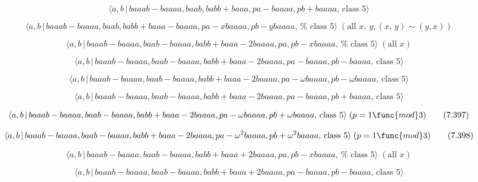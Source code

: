 \documentclass[10pt]{article}
\begin{document}
\begin{equation}
\langle a,b\,|\,baaab-baaaa,baab,babb+baaa,pa-baaaa,pb+baaaa,\,\text{class }%
5\rangle  \tag{7.391}
\end{equation}

\begin{equation}
\langle a,b\,|\,baaab-baaaa,baab,babb+baaa-baaaa,pa-xbaaaa,pb-ybaaaa,\,\text{%
class }5\rangle \;(\text{all }x,\,y,(x,\,y)\sim (y,x))  \tag{7.392}
\end{equation}

\begin{equation}
\langle a,b\,|\,baaab-baaaa,baab-baaaa,babb+baaa-2baaaa,pa,pb-xbaaaa,\,\text{%
class }5\rangle \;(\text{all }x)  \tag{7.393}
\end{equation}

\begin{equation}
\langle a,b\,|\,baaab-baaaa,baab-baaaa,babb+baaa-2baaaa,pa-baaaa,pb-baaaa,\,%
\text{class }5\rangle  \tag{7.394}
\end{equation}

\begin{equation}
\langle a,b\,|\,baaab-baaaa,baab-baaaa,babb+baaa-2baaaa,pa-\omega
baaaa,pb-\omega baaaa,\,\text{class }5\rangle  \tag{7.395}
\end{equation}

\begin{equation}
\langle a,b\,|\,baaab-baaaa,baab-baaaa,babb+baaa-2baaaa,pa-baaaa,pb+baaaa,\,%
\text{class }5\rangle  \tag{7.396}
\end{equation}

\begin{equation}
\langle a,b\,|\,baaab-baaaa,baab-baaaa,babb+baaa-2baaaa,pa-\omega
baaaa,pb+\omega baaaa,\,\text{class }5\rangle \;(p=1\func{mod}3)  \tag{7.397}
\end{equation}

\begin{equation}
\langle a,b\,|\,baaab-baaaa,baab-baaaa,babb+baaa-2baaaa,pa-\omega
^{2}baaaa,pb+\omega ^{2}baaaa,\,\text{class }5\rangle \;(p=1\func{mod}3) 
\tag{7.398}
\end{equation}

\begin{equation}
\langle a,b\,|\,baaab-baaaa,baab-baaaa,babb+baaa+2baaaa,pa,pb-xbaaaa,\,\text{%
class }5\rangle \;(\text{all }x)  \tag{7.399}
\end{equation}

\begin{equation}
\langle a,b\,|\,baaab-baaaa,baab-baaaa,babb+baaa+2baaaa,pa-baaaa,pb-baaaa,\,%
\text{class }5\rangle  \tag{7.400}
\end{equation}
\end{document}
